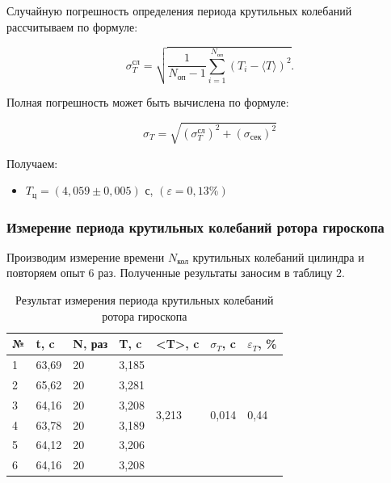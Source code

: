\label{formuli}


    Случайную погрешность определения периода крутильных колебаний рассчитываем по формуле:

\[
\sigma^{\text{сл}}_T = \sqrt{\frac{1}{N_\text{оп} - 1} \sum_{i = 1}^{N_\text{оп}} \left(T_i - \langle T \rangle \right)^2}.
\]

    Полная погрешность может быть вычислена по формуле:

\[
\sigma_T = \sqrt{\left( \sigma^\text{сл}_T \right)^2 + \left( \sigma_\text{сек} \right)^2  }
\]

    Получаем:

\begin{itemize}
	\item $ T_\text{ц} = \left( 4,059 \pm 0,005\right) $ с, $ \left(\varepsilon = 0,13 \% \right)  $
\end{itemize}





\subsubsection{Измерение периода крутильных колебаний ротора гироскопа}

    Производим измерение времени $ N_\text{кол} $ крутильных колебаний цилиндра и повторяем опыт 6 раз. Полученные результаты заносим в таблицу 2.


\begin{table}[H]
\centering
\begin{tabular}{|l|l|l|l|l|l|l|}
\hline
№ & t, c  & N, раз & T, c  & \textless{}T\textgreater{}, c & $\sigma_T$, c              & $\varepsilon_T$, \%      \\ \hline
1 & 63,69 & 20     & 3,185 & \multirow{6}{*}{3,213}        & \multirow{6}{*}{0,014} & \multirow{6}{*}{0,44} \\ \cline{1-4}
2 & 65,62 & 20     & 3,281 &                               &                         &                       \\ \cline{1-4}
3 & 64,16 & 20     & 3,208 &                               &                         &                       \\ \cline{1-4}
4 & 63,78 & 20     & 3,189 &                               &                         &                       \\ \cline{1-4}
5 & 64,12 & 20     & 3,206 &                               &                         &                       \\ \cline{1-4}
6 & 64,16 & 20     & 3,208 &                               &                         &                       \\ \hline
	\end{tabular}
	\caption{Результат измерения периода крутильных колебаний ротора гироскопа}
	\label{krut_gir}
\end{table}


